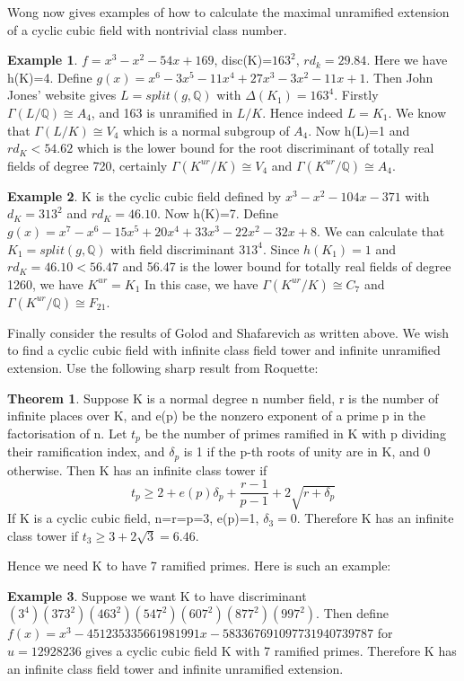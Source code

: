 \documentclass[12pt]{extarticle}
\newcommand{\Q}{\mathbb{Q}}
\newcommand{\<}{\langle}
\renewcommand{\>}{\rangle}
\theoremstyle{definition}
\newtheorem{theorem}{Theorem}
\newtheorem*{example}{Example}
\begin{document}
Wong now gives examples of how to calculate the maximal unramified extension of a cyclic cubic field with nontrivial class number. \begin{example}
    $f=x^3-x^2-54x+169$, disc(K)=$163^2$, $rd_{k}=29.84$. Here we have h(K)=4. Define $g(x)=x^6-3x^5-11x^4+27x^3-3x^2-11x+1$. Then John Jones' website gives $L = split(g,\mathbb{Q})$ with $\Delta(K_1)=163^4$. Firstly $\Gamma(L/\mathbb{Q}) \cong A_4$, and 163 is unramified in $L/K$. Hence indeed $L=K_1$. We know that $\Gamma(L/K)\cong V_4$ which is a normal subgroup of $A_4$. Now h(L)=1 and $rd_K < 54.62$ which is the lower bound for the root discriminant of totally real fields of degree 720, certainly $\Gamma(K^{ur}/K) \cong V_4$ and $\Gamma(K^{ur}/\mathbb{Q}) \cong A_4$. 
\end{example}
\begin{example}
K is the cyclic cubic field defined by $x^3-x^2-104x-371$ with $d_K = 313^2$
and $rd_{K} = 46.10$. Now h(K)=7. Define $g(x) = x^7-x^6-15x^5+20x^4+33x^3-22x^2-32x+8$. We can calculate that $K_1=split(g,\Q)$ with field discriminant $313^4$. Since $h(K_1) = 1$ and $rd_K = 46.10 < 56.47$ and 56.47 is the lower
bound for totally real fields of degree 1260, we have $K^{ur}=K_1$ In this
case, we have $\Gamma(K^{ur}/K) \cong C_7$ and $\Gamma(K^{ur}/\mathbb{Q}) \cong F_{21} $.  
\end{example}
Finally consider the results of Golod and Shafarevich as written above. We wish to find a cyclic cubic field with infinite class field tower and infinite unramified extension. Use the following sharp result from Roquette:
\begin{theorem}
    Suppose K is a normal degree n number field, r is the number of infinite places over K, and e(p) be the nonzero exponent of a prime p in the factorisation of n. Let $t_p$ be the number of primes ramified in K with p dividing their ramification index, and $\delta_p$ is 1 if the p-th roots of unity are in K, and 0 otherwise. Then K has an infinite class tower if \begin{equation}
        t_p\geqslant 2 + e(p)\delta_p + \frac{r-1}{p-1} + 2 \sqrt{r+\delta_p}
    \end{equation}
 If K is a cyclic cubic field,  n=r=p=3, e(p)=1, $\delta_3 = 0$. Therefore K has an infinite class tower if $t_3 \geq 3 + 2\sqrt{3} = 6.46$. 
\end{theorem}
Hence we need K to have 7 ramified primes. Here is such an example:
\begin{example}
    Suppose we want K to have discriminant $(3^4)(373^2)(463^2)(547^2)(607^2)(877^2)(997^2)$. Then define $f(x) = x^3 -451235335661981991x-583367691097731940739787$ for $u=12928236$ gives a cyclic cubic field K with 7 ramified primes. Therefore K has an infinite class field tower and infinite unramified extension. 
\end{example}
\end{document}
